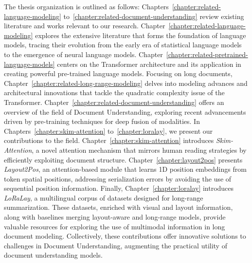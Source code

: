 The thesis organization is outlined as follows: Chapters~\ref{chapter:related-language-modeling} to~\ref{chapter:related-document-understanding} review existing literature and works relevant to our research. Chapter~\ref{chapter:related-language-modeling} explores the extensive literature that forms the foundation of language models, tracing their evolution from the early era of statistical language models to the emergence of neural language models. Chapter~\ref{chapter:related-pretrained-language-models} centers on the Transformer architecture \citep{vaswani2017attention} and its application in creating powerful pre-trained language models. Focusing on long documents, Chapter~\ref{chapter:related-long-range-modeling} delves into modeling advances and architectural innovations that tackle the quadratic complexity issue of the Transformer. Chapter~\ref{chapter:related-document-understanding} offers an overview of the field of Document Understanding, exploring recent advancements driven by pre-training techniques for deep fusion of modalities. In Chapters~\ref{chapter:skim-attention} to~\ref{chapter:loralay}, we present our contributions to the field. Chapter~\ref{chapter:skim-attention} introduces \textit{Skim-Attention}, a novel attention mechanism that mirrors human reading strategies by efficiently exploiting document structure. Chapter~\ref{chapter:layout2pos} presents \textit{Layout2Pos}, an attention-based module that learns 1D position embeddings from token spatial positions, addressing serialization errors by avoiding the use of sequential position information. Finally, Chapter~\ref{chapter:loralay} introduces \textit{LoRaLay}, a multilingual corpus of datasets designed for long-range summarization. These datasets, enriched with visual and layout information, along with baselines merging layout-aware and long-range models, provide valuable resources for exploring the use of multimodal information in long document modeling. Collectively, these contributions offer innovative solutions to challenges in Document Understanding, augmenting the practical utility of document understanding models.


